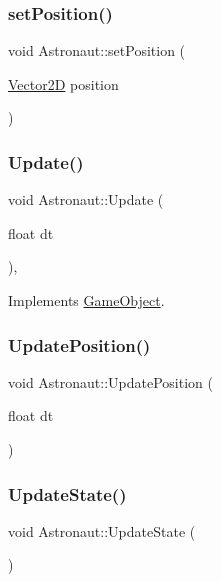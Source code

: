 \subsubsection{\texorpdfstring{set\+Position()}{setPosition()}}
{\footnotesize\ttfamily void Astronaut\+::set\+Position (\begin{DoxyParamCaption}\item[{\hyperlink{class_vector2_d}{Vector2D}}]{position }\end{DoxyParamCaption})}

\hypertarget{class_astronaut_a808e903cd53b5ce1e18c781ec06b1ead}{}\label{class_astronaut_a808e903cd53b5ce1e18c781ec06b1ead} 
\subsubsection{\texorpdfstring{Update()}{Update()}}
{\footnotesize\ttfamily void Astronaut\+::\+Update (\begin{DoxyParamCaption}\item[{float}]{dt }\end{DoxyParamCaption})\hspace{0.3cm}{\ttfamily [override]}, {\ttfamily [virtual]}}



Implements \hyperlink{class_game_object_a93ed63df640deb516a020530e7f8e045}{Game\+Object}.

\hypertarget{class_astronaut_a77c1d345c987d6d046642008a6f44343}{}\label{class_astronaut_a77c1d345c987d6d046642008a6f44343} 
\subsubsection{\texorpdfstring{Update\+Position()}{UpdatePosition()}}
{\footnotesize\ttfamily void Astronaut\+::\+Update\+Position (\begin{DoxyParamCaption}\item[{float}]{dt }\end{DoxyParamCaption})}

\hypertarget{class_astronaut_a574c4bb77cfb3f416ef1d51e54dca1f0}{}\label{class_astronaut_a574c4bb77cfb3f416ef1d51e54dca1f0} 
\subsubsection{\texorpdfstring{Update\+State()}{UpdateState()}}
{\footnotesize\ttfamily void Astronaut\+::\+Update\+State (\begin{DoxyParamCaption}{ }\end{DoxyParamCaption})}

